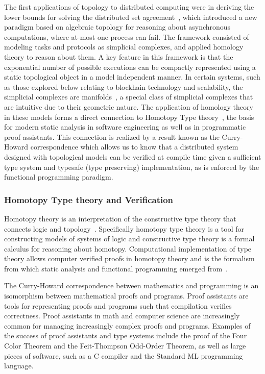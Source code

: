 \documentclass[runningheads]{llncs}
\begin{document}
The first applications of topology to distributed computing were in deriving the lower bounds for solving the distributed set agreement~\cite{ref_article12}, which introduced a new paradigm based on algebraic topology for reasoning about asynchronous computations, where at-most one process can fail. The framework consisted of modeling tasks and protocols as simplicial complexes, and applied homology~\cite{ref_article5,ref_article9} theory to reason about them. A key feature in this framework is that the exponential number of possible executions can be compactly represented using a static topological object in a model independent manner. In certain systems, such as those explored below relating to blockhain technology and scalability, the simplicial complexes are manifolds~\cite{ref_article6,ref_article7,ref_article8}, a special class of simplicial complexes that are intuitive due to their geometric nature. The application of homology theory in these models forms a direct connection to Homotopy Type theory~\cite{ref_article9,ref_article10}, the basis for modern static analysis in software engineering as well as in programmatic proof assistants. This connection is realized by a result known as the Curry-Howard correspondence which allows us to know that a distributed system designed with topological models can be verified at compile time given a sufficient type system and typesafe (type preserving) implementation, as is enforced by the functional programming paradigm.

\subsubsection{Homotopy Type theory and Verification}
Homotopy theory is an interpretation of the constructive type theory that connects logic and topology~\cite{ref_book1}. Specifically homotopy type theory is a tool for constructing models of systems of logic and constructive type theory is a formal calculus for reasoning about homotopy. Computational implementation of type theory allows computer verified proofs in homotopy theory and is the formalism from which static analysis and functional programming emerged from~\cite{ref_article10}.

The Curry-Howard correspondence between mathematics and programming is an isomorphism between mathematical proofs and programs. Proof assistants are tools for representing proofs and programs such that compilation verifies correctness. Proof assistants in math and computer science are increasingly common for managing increasingly complex proofs and programs. Examples of the success of proof assistants and type systems include the proof of the Four Color Theorem and the Feit-Thompson Odd-Order Theorem, as well as large pieces of software, such as a C compiler and the Standard ML programming language.
\end{document}
